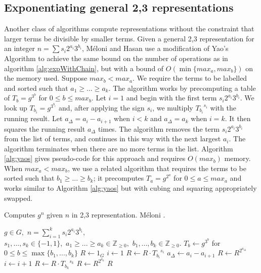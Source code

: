 \documentclass{ucalgthes1}
\theoremstyle{definition}
\newcommand{\ZZgez}{\mathbb{Z}_{\ge 0}}
\begin{document}
\bigbreak
\subsection{Exponentiating general 2,3 representations}

Another class of algorithms compute representations without the constraint that larger terms be divisible by smaller terms.  Given a general 2,3 representation for an integer $n = \sum s_i 2^{a_i} 3^{b_i}$, M\'{e}loni and Hasan \cite[Section 3.2]{Meloni2009} use a modification of Yao's Algorithm to achieve the same bound on the number of operations as in algorithm \ref{alg:expWithChain}, but with a bound of $O(\min \{max_a, max_b\})$ on the memory used.  Suppose $max_b < max_a$.  We require the terms to be labelled and sorted such that $a_1 \ge ... \ge a_k$.  The algorithm works by precomputing a table of $T_b = g^{3^b}$ for $0 \le b \le max_b$.  Let $i=1$ and begin with the first term $s_i2^{a_i}3^{b_i}$.  We look up $T_{b_i} = g^{3^{b_i}}$ and, after applying the sign $s_i$, we multiply ${T_{b_i}}^{s_i}$ with the running result.  Let $a_\Delta = a_i - a_{i+1}$ when $i < k$ and $a_\Delta = a_k$ when $i = k$.  It then squares the running result $a_\Delta$ times.  The algorithm removes the term $s_i2^{a_i}3^{b_i}$ from the list of terms, and continues in this way with the next largest $a_i$.  The algorithm terminates when there are no more terms in the list.  Algorithm  \ref{alg:yaos} gives pseudo-code for this approach and requires $O(max_b)$ memory.  When $max_a < max_b$, we use a related algorithm that requires the terms to be sorted such that $b_1 \ge ... \ge b_k$; it precomputes $T_a = g^{2^a}$ for $0 \le a \le max_a$ and works similar to Algorithm \ref{alg:yaos} but with cubing and squaring appropriately swapped.

\begin{algorithm}[h]
\caption{Computes $g^n$ given $n$ in 2,3 representation. M\'{e}loni \cite[Section 3.2]{Meloni2009}.}
\label{alg:yaos}
\begin{algorithmic}[1]
\REQUIRE $g \in G,$ 
$n = \sum_{i=1}^k s_i2^{a_i}3^{b_i},$ \\
$s_1,...,s_k \in \{-1, 1\},$ 
$a_1 \ge ... \ge a_k \in \ZZgez,$ 
$b_1,...,b_k \in \ZZgez.$
\STATE $T_b \gets g^{3^b}$ for $0 \le b \le \max \{ b_1, ..., b_k \}$ 
\STATE $R \gets 1_G$
\STATE $i \gets 1$
	\STATE $R \gets R \cdot {T_{b_i}}^{s_i}$ 
	\STATE $a_\Delta \gets a_i - a_{i+1}$
	\STATE $R \gets R ^ {2^{a_\Delta}}$ 
	\STATE $i \gets i + 1$
\ENDWHILE
\STATE $R \gets R \cdot {T_{b_k}}^{s_k}$
\STATE $R \gets R ^ {2^{a_k}}$ 
\RETURN $R$
\end{algorithmic}
\end{algorithm}
\end{document}
